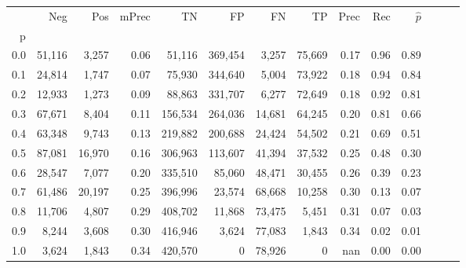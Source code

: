 \begin{tabular}{rrrrrrrrrrrrrr}
\toprule
{} &     Neg &     Pos & mPrec &       TN &       FP &      FN &      TP &  Prec &   Rec & $\hat{p}$ \\
p   &         &         &       &          &          &         &         &       &       &           \\
\midrule
0.0 &  51,116 &   3,257 &  0.06 &   51,116 &  369,454 &   3,257 &  75,669 &  0.17 &  0.96 &      0.89 \\
0.1 &  24,814 &   1,747 &  0.07 &   75,930 &  344,640 &   5,004 &  73,922 &  0.18 &  0.94 &      0.84 \\
0.2 &  12,933 &   1,273 &  0.09 &   88,863 &  331,707 &   6,277 &  72,649 &  0.18 &  0.92 &      0.81 \\
0.3 &  67,671 &   8,404 &  0.11 &  156,534 &  264,036 &  14,681 &  64,245 &  0.20 &  0.81 &      0.66 \\
0.4 &  63,348 &   9,743 &  0.13 &  219,882 &  200,688 &  24,424 &  54,502 &  0.21 &  0.69 &      0.51 \\
0.5 &  87,081 &  16,970 &  0.16 &  306,963 &  113,607 &  41,394 &  37,532 &  0.25 &  0.48 &      0.30 \\
0.6 &  28,547 &   7,077 &  0.20 &  335,510 &   85,060 &  48,471 &  30,455 &  0.26 &  0.39 &      0.23 \\
0.7 &  61,486 &  20,197 &  0.25 &  396,996 &   23,574 &  68,668 &  10,258 &  0.30 &  0.13 &      0.07 \\
0.8 &  11,706 &   4,807 &  0.29 &  408,702 &   11,868 &  73,475 &   5,451 &  0.31 &  0.07 &      0.03 \\
0.9 &   8,244 &   3,608 &  0.30 &  416,946 &    3,624 &  77,083 &   1,843 &  0.34 &  0.02 &      0.01 \\
1.0 &   3,624 &   1,843 &  0.34 &  420,570 &        0 &  78,926 &       0 &   nan &  0.00 &      0.00 \\
\bottomrule
\end{tabular}
